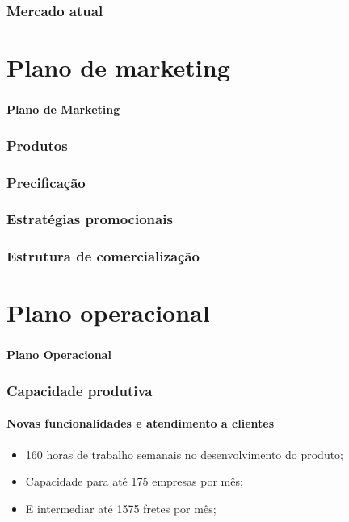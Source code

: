\documentclass{beamer}
\begin{document}
\begin{frame}
  \frametitle{Mercado atual}
  \framesubtitle{}

\end{frame}

\section{Plano de marketing}

\begin{frame}
  \frametitle{}
  \framesubtitle{}

  \begin{center}
    {\huge\textbf{Plano de Marketing}}
  \end{center}
\end{frame}

\begin{frame}
  \frametitle{Produtos}
  \framesubtitle{}

\end{frame}

\begin{frame}
  \frametitle{Precificação}
  \framesubtitle{}

\end{frame}

\begin{frame}
  \frametitle{Estratégias promocionais}
  \framesubtitle{}

\end{frame}

\begin{frame}
  \frametitle{Estrutura de comercialização}
  \framesubtitle{}

\end{frame}

\section{Plano operacional}
\begin{frame}
  \frametitle{}
  \framesubtitle{}

  \begin{center}
    {\huge\textbf{Plano Operacional}}
  \end{center}
\end{frame}

\begin{frame}
  \frametitle{Capacidade produtiva}
  \framesubtitle{Novas funcionalidades e atendimento a clientes}
  
  \begin{itemize}
    \item 160 horas de trabalho semanais no desenvolvimento do produto;
    \item Capacidade para até 175 empresas por mês;
    \item E intermediar até 1575 fretes por mês;
  \end{itemize}
    
\end{frame}
\end{document}

